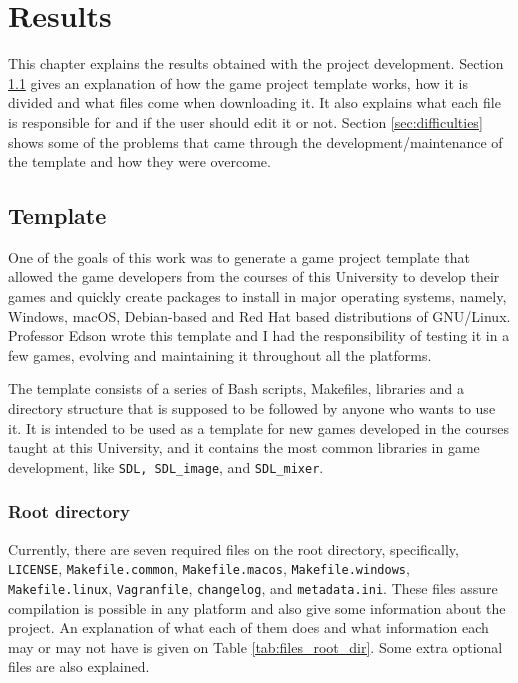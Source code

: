 \chapter[Results]{Results}
\label{sec:results}

This chapter explains the results obtained with the project development. Section \ref{sec:template} gives an explanation of how the game project template works, how it is divided and what files come when downloading it. It also explains what each file is responsible for and if the user should edit it or not. Section \ref{sec:difficulties} shows some of the problems that came through the development/maintenance of the template and how they were overcome.


\section{Template}
\label{sec:template}

One of the goals of this work was to generate a game project template that allowed the game developers from the courses of this University to develop their games and quickly create packages to install in major operating systems, namely, Windows, macOS, Debian-based and Red Hat based distributions of GNU/Linux. Professor Edson wrote this template and I had the responsibility of testing it in a few games, evolving and maintaining it throughout all the platforms.

The template consists of a series of Bash scripts, Makefiles, libraries and a directory structure that is supposed to be followed by anyone who wants to use it. It is intended to be used as a template for new games developed in the courses taught at this University, and it contains the most common libraries in game development, like \texttt{SDL, SDL\_image}, and \texttt{SDL\_mixer}.

\subsection{Root directory}
\label{sec:root_directory}

Currently, there are seven required files on the root directory, specifically, \texttt{LICENSE}, \texttt{Makefile.common}, \texttt{Makefile.macos}, \texttt{Makefile.windows}, \texttt{Makefile.linux}, \texttt{Vagranfile}, \texttt{changelog}, and \texttt{metadata.ini}. These files assure compilation is possible in any platform and also give some information about the project. An explanation of what each of them does and what information each may or may not have is given on Table \ref{tab:files_root_dir}. Some extra optional files are also explained.


